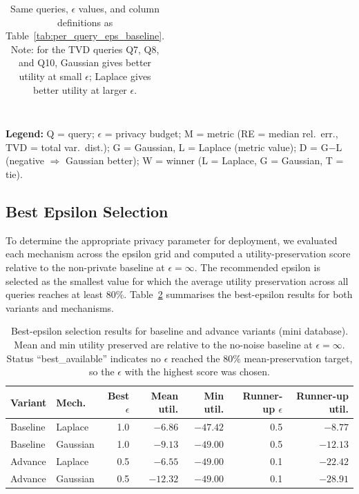 \documentclass[12pt,letterpaper]{article}
\begin{document}
\begin{table}[H]
\begin{minipage}[t]{0.48\textwidth}
\begin{tabular}{@{}clcrrrl@{}}
\end{tabular}
\caption{Same queries, $\epsilon$ values, and column definitions as Table~\ref{tab:per_query_eps_baseline}. Note: for the TVD queries Q7, Q8, and Q10, Gaussian gives better utility at small $\epsilon$; Laplace gives better utility at larger $\epsilon$.}
\label{tab:per_query_eps_advance}
\end{minipage}\\[0.45em]
\scriptsize
\textbf{Legend:} Q = query; $\epsilon$ = privacy budget; M = metric (RE = median rel.\ err., TVD = total var.\ dist.); G = Gaussian, L = Laplace (metric value); D = G$-$L (negative $\Rightarrow$ Gaussian better); W = winner (L = Laplace, G = Gaussian, T = tie).
\setlength{\tabcolsep}{6pt}
\renewcommand{\arraystretch}{1}
\end{table}
\normalsize

\clearpage
\subsection{Best Epsilon Selection}
\label{sec:best_epsilon}

To determine the appropriate privacy parameter for deployment, we evaluated each mechanism across the epsilon grid and computed a utility-preservation score relative to the non-private baseline at $\epsilon = \infty$. The recommended epsilon is selected as the smallest value for which the average utility preservation across all queries reaches at least 80\%. Table~\ref{tab:best_epsilon} summarises the best-epsilon results for both variants and mechanisms.

\begin{table}[H]
\centering
\caption{Best-epsilon selection results for baseline and advance variants (mini database). Mean and min utility preserved are relative to the no-noise baseline at $\epsilon=\infty$. Status ``best\_available'' indicates no $\epsilon$ reached the 80\% mean-preservation target, so the $\epsilon$ with the highest score was chosen.}
\label{tab:best_epsilon}
\small
\begin{tabular}{@{}llrrrrr@{}}
\toprule
\textbf{Variant} & \textbf{Mech.} & \textbf{Best $\epsilon$} & \textbf{Mean util.} & \textbf{Min util.} & \textbf{Runner-up $\epsilon$} & \textbf{Runner-up util.} \\
\midrule
Baseline & Laplace  & 1.0 & $-6.86$  & $-47.42$ & 0.5 & $-8.77$ \\
Baseline & Gaussian & 1.0 & $-9.13$  & $-49.00$ & 0.5 & $-12.13$ \\
Advance  & Laplace  & 0.5 & $-6.55$  & $-49.00$ & 0.1 & $-22.42$ \\
Advance  & Gaussian & 0.5 & $-12.32$ & $-49.00$ & 0.1 & $-28.91$ \\
\bottomrule
\end{tabular}
\end{table}
\end{document}
